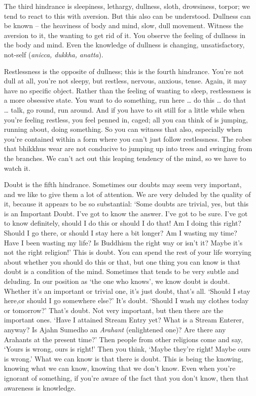 The third hindrance is sleepiness, lethargy, dullness, sloth, drowsiness, torpor; we tend to react to this with aversion. But this also can be understood. Dullness can be known -- the heaviness of body and mind, slow, dull movement. Witness the aversion to it, the wanting to get rid of it. You observe the feeling of dullness in the body and mind. Even the knowledge of dullness is changing, unsatisfactory, not-self (\textit{anicca, dukkha, anatta}).

Restlessness is the opposite of dullness; this is the fourth hindrance. You're not dull at all, you're not sleepy, but restless, nervous, anxious, tense. Again, it may have no specific object. Rather than the feeling of wanting to sleep, restlessness is a more obsessive state. You want to do something, run here \ldots{} do this \ldots{} do that \ldots{} talk, go round, run around. And if you have to sit still for a little while when you're feeling restless, you feel penned in, caged; all you can think of is jumping, running about, doing something. So you can witness that also, especially when you're contained within a form where you can't just follow restlessness. The robes that bhikkhus wear are not conducive to jumping up into trees and swinging from the branches. We can't act out this leaping tendency of the mind, so we have to watch it.

Doubt is the fifth hindrance. Sometimes our doubts may seem very important, and we like to give them a lot of attention. We are very deluded by the quality of it, because it appears to be so substantial: `Some doubts are trivial, yes, but this is an Important Doubt. I've got to know the answer. I've got to be sure. I've got to know definitely, should I do this or should I do that! Am I doing this right? Should I go there, or should I stay here a bit longer? Am I wasting my time? Have I been wasting my life? Is Buddhism the right way or isn't it? Maybe it's not the right religion!' This is doubt. You can spend the rest of your life worrying about whether you should do this or that, but one thing you can know is that doubt is a condition of the mind. Sometimes that tends to be very subtle and deluding. In our position as `the one who knows', we know doubt is doubt. Whether it's an important or trivial one, it's just doubt, that's all. `Should I stay here,or should I go somewhere else?' It's doubt. `Should I wash my clothes today or tomorrow?' That's doubt. Not very important, but then there are the important ones. `Have I attained Stream Entry yet? What is a Stream Enterer, anyway? Is Ajahn Sumedho an \textit{Arahant} (enlightened one)? Are there any Arahants at the present time?' Then people from other religions come and say, `Yours is wrong, ours is right!' Then you think, `Maybe they're right! Maybe ours is wrong.' What we can know is that there is doubt. This is being the knowing, knowing what we can know, knowing that we don't know. Even when you're ignorant of something, if you're aware of the fact that you don't know, then that awareness is knowledge.

